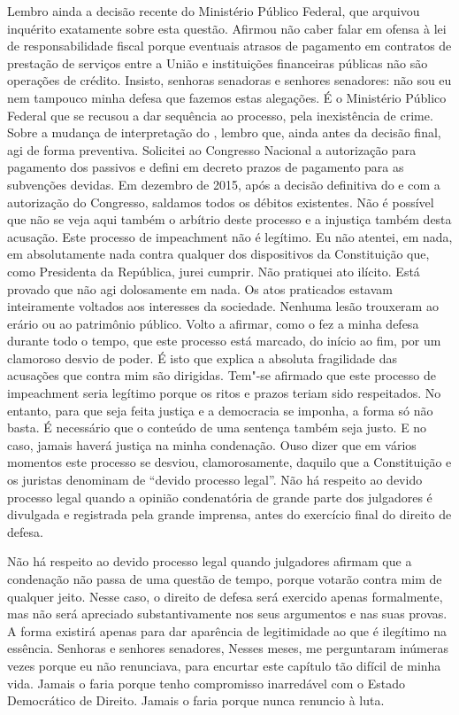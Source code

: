 Lembro ainda a decisão recente do Ministério Público Federal, que
arquivou inquérito exatamente sobre esta questão. Afirmou não caber
falar em ofensa à lei de responsabilidade fiscal porque eventuais
atrasos de pagamento em contratos de prestação de serviços entre a União
e instituições financeiras públicas não são operações de crédito.
Insisto, senhoras senadoras e senhores senadores: não sou eu nem
tampouco minha defesa que fazemos estas alegações. É o Ministério
Público Federal que se recusou a dar sequência ao processo, pela
inexistência de crime. Sobre a mudança de interpretação do , lembro
que, ainda antes da decisão final, agi de forma preventiva. Solicitei ao
Congresso Nacional a autorização para pagamento dos passivos e defini em
decreto prazos de pagamento para as subvenções devidas. Em dezembro de
2015, após a decisão definitiva do  e com a autorização do Congresso,
saldamos todos os débitos existentes. Não é possível que não se veja
aqui também o arbítrio deste processo e a injustiça também desta
acusação. Este processo de impeachment não é legítimo. Eu não atentei,
em nada, em absolutamente nada contra qualquer dos dispositivos da
Constituição que, como Presidenta da República, jurei cumprir. Não
pratiquei ato ilícito. Está provado que não agi dolosamente em nada. Os
atos praticados estavam inteiramente voltados aos interesses da
sociedade. Nenhuma lesão trouxeram ao erário ou ao patrimônio público.
Volto a afirmar, como o fez a minha defesa durante todo o tempo, que
este processo está marcado, do início ao fim, por um clamoroso desvio de
poder. É isto que explica a absoluta fragilidade das acusações que
contra mim são dirigidas. Tem"-se afirmado que este processo de
impeachment seria legítimo porque os ritos e prazos teriam sido
respeitados. No entanto, para que seja feita justiça e a democracia se
imponha, a forma só não basta. É necessário que o conteúdo de uma
sentença também seja justo. E no caso, jamais haverá justiça na minha
condenação. Ouso dizer que em vários momentos este processo se desviou,
clamorosamente, daquilo que a Constituição e os juristas denominam de
``devido processo legal''. Não há respeito ao devido processo legal
quando a opinião condenatória de grande parte dos julgadores é divulgada
e registrada pela grande imprensa, antes do exercício final do direito
de defesa.

Não há respeito ao devido processo legal quando julgadores afirmam que a
condenação não passa de uma questão de tempo, porque votarão contra mim
de qualquer jeito. Nesse caso, o direito de defesa será exercido apenas
formalmente, mas não será apreciado substantivamente nos seus argumentos
e nas suas provas. A forma existirá apenas para dar aparência de
legitimidade ao que é ilegítimo na essência. Senhoras e senhores
senadores, Nesses meses, me perguntaram inúmeras vezes porque eu não
renunciava, para encurtar este capítulo tão difícil de minha vida.
Jamais o faria porque tenho compromisso inarredável com o Estado
Democrático de Direito. Jamais o faria porque nunca renuncio à luta.

